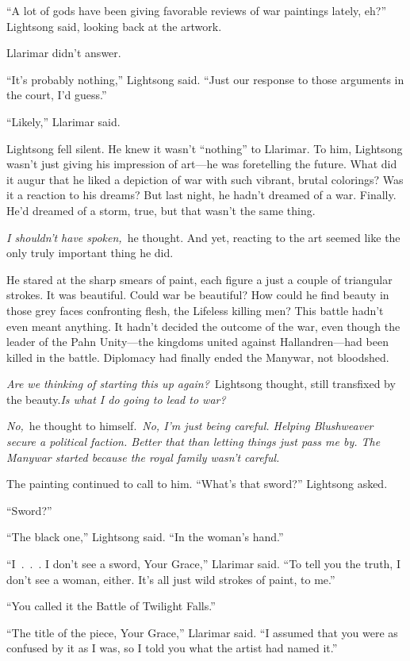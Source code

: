 “A lot of gods have been giving favorable reviews of war paintings lately, eh?” Lightsong said, looking back at the artwork.

Llarimar didn’t answer.

“It’s probably nothing,” Lightsong said. “Just our response to those arguments in the court, I’d guess.”

“Likely,” Llarimar said.

Lightsong fell silent. He knew it wasn’t “nothing” to Llarimar. To him, Lightsong wasn’t just giving his impression of art—he was foretelling the future. What did it augur that he liked a depiction of war with such vibrant, brutal colorings? Was it a reaction to his dreams? But last night, he hadn’t dreamed of a war. Finally. He’d dreamed of a storm, true, but that wasn’t the same thing.

\textit{I shouldn’t have spoken,}~he thought. And yet, reacting to the art seemed like the only truly important thing he did.

He stared at the sharp smears of paint, each figure a just a couple of triangular strokes. It was beautiful. Could war be beautiful? How could he find beauty in those grey faces confronting flesh, the Lifeless killing men? This battle hadn’t even meant anything. It hadn’t decided the outcome of the war, even though the leader of the Pahn Unity—the kingdoms united against Hallandren—had been killed in the battle. Diplomacy had finally ended the Manywar, not bloodshed.

\textit{Are we thinking of starting this up again?}~Lightsong thought, still transfixed by the beauty.\textit{Is what I do going to lead to war?}

\textit{No,}~he thought to himself.~\textit{No, I’m just being careful. Helping Blushweaver secure a political faction. Better that than letting things just pass me by. The Manywar started because the royal family wasn’t careful.}

The painting continued to call to him. “What’s that sword?” Lightsong asked.

“Sword?”

“The black one,” Lightsong said. “In the woman’s hand.”

“I~.~.~. I don’t see a sword, Your Grace,” Llarimar said. “To tell you the truth, I don’t see a woman, either. It’s all just wild strokes of paint, to me.”

“You called it the Battle of Twilight Falls.”

“The title of the piece, Your Grace,” Llarimar said. “I assumed that you were as confused by it as I was, so I told you what the artist had named it.”

